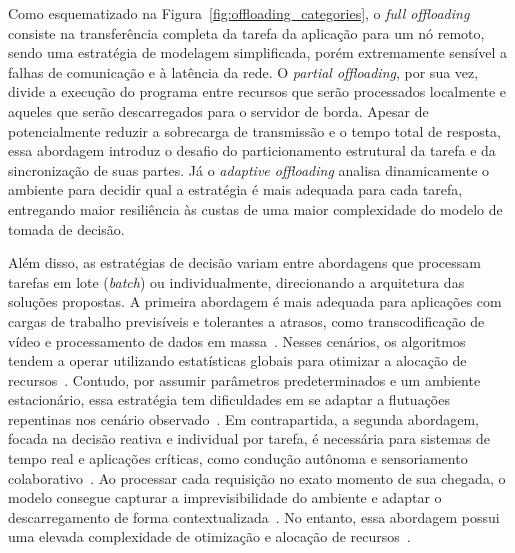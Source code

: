 Como esquematizado na Figura~\ref{fig:offloading_categories}, o \textit{full offloading} consiste na transferência completa da tarefa da aplicação para um nó remoto, sendo uma estratégia de modelagem simplificada, porém extremamente sensível a falhas de comunicação e à latência da rede. O \textit{partial offloading}, por sua vez, divide a execução do programa entre recursos que serão processados localmente e aqueles que serão descarregados para o servidor de borda. Apesar de potencialmente reduzir a sobrecarga de transmissão e o tempo total de resposta, essa abordagem introduz o desafio do particionamento estrutural da tarefa e da sincronização de suas partes. Já o \textit{adaptive offloading} analisa dinamicamente o ambiente para decidir qual a estratégia é mais adequada para cada tarefa, entregando maior resiliência às custas de uma maior complexidade do modelo de tomada de decisão. 

Além disso, as estratégias de decisão variam entre abordagens que processam tarefas em lote (\textit{batch}) ou individualmente, direcionando a arquitetura das soluções propostas. A primeira abordagem é mais adequada para aplicações com cargas de trabalho previsíveis e tolerantes a atrasos, como transcodificação de vídeo e processamento de dados em massa~\cite{wang2022}. Nesses cenários, os algoritmos tendem a operar utilizando estatísticas globais para otimizar a alocação de recursos~\cite{li2020genetic, you2021efficient}. Contudo, por assumir parâmetros predeterminados e um ambiente estacionário, essa estratégia tem dificuldades em se adaptar a flutuações repentinas nos cenário observado~\cite{he2025, luo2024}. Em contrapartida, a segunda abordagem, focada na decisão reativa e individual por tarefa, é necessária para sistemas de tempo real e aplicações críticas, como condução autônoma e sensoriamento colaborativo~\cite{RANI2023108543}. Ao processar cada requisição no exato momento de sua chegada, o modelo consegue capturar a imprevisibilidade do ambiente e adaptar o descarregamento de forma contextualizada~\cite{uddin2025}. No entanto, essa abordagem possui uma elevada complexidade de otimização e alocação de recursos~\cite{kandali2025, zhao2025}.


